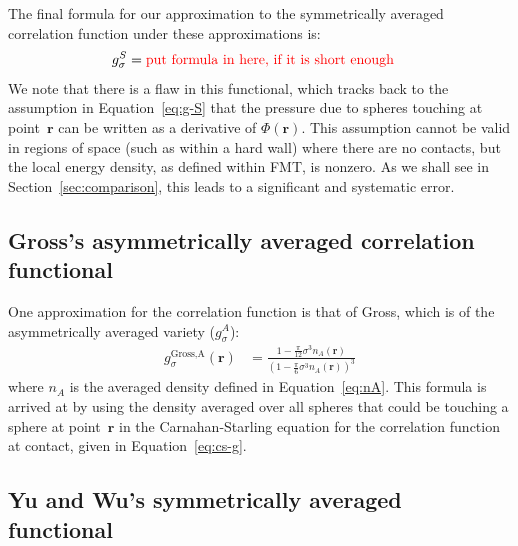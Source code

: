 \documentclass[letterpaper,twocolumn,amsmath,amssymb,jcp,10pt,aip]{revtex4-1}
\newcommand{\rr}{\textbf{r}}
\begin{document}
The final formula for our approximation to the symmetrically averaged
correlation function under these approximations is:
\begin{align}
  g_\sigma^S &= \text{\textcolor{red}{put formula in here, if it is
      short enough}}
\end{align}
We note that there is a flaw in this functional, which tracks back to
the assumption in Equation~\ref{eq:g-S} that the pressure due to
spheres touching at point~$\rr$ can be written as a derivative of
$\Phi(\rr)$.  This assumption cannot be valid in regions of space
(such as within a hard wall) where there are no contacts, but the
local energy density, as defined within FMT, is nonzero.  As we shall
see in Section~\ref{sec:comparison}, this leads to a significant and
systematic error.

\subsection{Gross's asymmetrically averaged correlation functional}\label{sec:gross}
One approximation for the correlation function is that of
Gross\cite{gross2009density}, which is of the asymmetrically averaged
variety ($g_\sigma^A$):
\begin{align}
  g_\sigma^\text{Gross,A}(\rr) &= \frac{1 - \frac{\pi}{12}\sigma^3n_A(\rr)}{\left(1 -
    \frac{\pi}{6}\sigma^3n_A(\rr)\right)^3}
\end{align}
where $n_A$ is the averaged density defined in Equation~\ref{eq:nA}.
This formula is arrived at by using the density averaged over all
spheres that could be touching a sphere at point~$\rr$ in the
Carnahan-Starling equation for the correlation function at contact,
given in Equation~\ref{eq:cs-g}.

\subsection{Yu and Wu's symmetrically averaged functional}\label{sec:yuwu}
\end{document}
